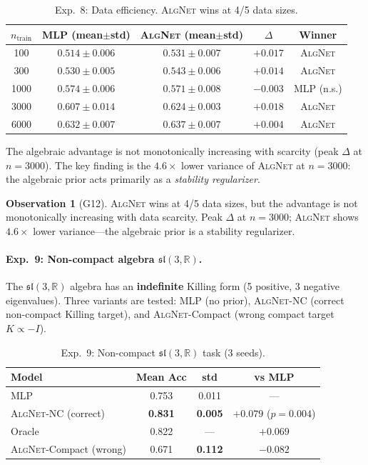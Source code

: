 \documentclass[11pt,a4paper]{article}
\newcommand{\fksl}{\mathfrak{sl}}
\newcommand{\RR}{\mathbb{R}}
\newcommand{\AlgNet}{\textsc{AlgNet}}
\theoremstyle{definition}
\newtheorem{observation}{Observation}
\begin{document}
\begin{table}[H]
\centering
\caption{Exp.~8: Data efficiency. \AlgNet{} wins at 4/5 data sizes.}
\label{tab:exp8}
\begin{tabular}{ccccc}
\toprule
$n_{\mathrm{train}}$ & MLP (mean$\pm$std) & \AlgNet{} (mean$\pm$std) & $\Delta$ & Winner \\
\midrule
100   & $0.514 \pm 0.006$ & $0.531 \pm 0.007$ & $+0.017$ & \AlgNet{} \\
300   & $0.530 \pm 0.005$ & $0.543 \pm 0.006$ & $+0.014$ & \AlgNet{} \\
1000  & $0.574 \pm 0.006$ & $0.571 \pm 0.008$ & $-0.003$ & MLP (n.s.) \\
3000  & $0.607 \pm 0.014$ & $0.624 \pm \mathbf{0.003}$ & $+0.018$ & \AlgNet{} \\
6000  & $0.632 \pm 0.007$ & $0.637 \pm 0.007$ & $+0.004$ & \AlgNet{} \\
\bottomrule
\end{tabular}
\end{table}

The algebraic advantage is not monotonically increasing with scarcity 
(peak $\Delta$ at $n = 3000$). The key finding is the 
$4.6\times$ lower variance of \AlgNet{} at $n = 3000$: the algebraic 
prior acts primarily as a \emph{stability regularizer}.

\begin{observation}[G12]
\AlgNet{} wins at 4/5 data sizes, but the advantage is not 
monotonically increasing with data scarcity. Peak $\Delta$ at 
$n = 3000$; \AlgNet{} shows $4.6\times$ lower variance---the 
algebraic prior is a stability regularizer.
\end{observation}

\paragraph{Exp.~9: Non-compact algebra $\fksl(3,\RR)$.}
The $\fksl(3,\RR)$ algebra has an \textbf{indefinite} Killing form 
(5 positive, 3 negative eigenvalues). Three variants are tested: 
MLP (no prior), \AlgNet{}-NC (correct non-compact Killing target), and 
\AlgNet{}-Compact (wrong compact target $K \propto -I$).

\begin{table}[H]
\centering
\caption{Exp.~9: Non-compact $\fksl(3,\RR)$ task (3 seeds).}
\label{tab:exp9}
\begin{tabular}{lccc}
\toprule
Model & Mean Acc & std & vs MLP \\
\midrule
MLP & 0.753 & 0.011 & --- \\
\AlgNet{}-NC (correct) & \textbf{0.831} & \textbf{0.005} & $+0.079$ ($p = 0.004$) \\
Oracle & 0.822 & --- & $+0.069$ \\
\AlgNet{}-Compact (wrong) & 0.671 & \textbf{0.112} & $-0.082$ \\
\bottomrule
\end{tabular}
\end{table}
\end{document}

